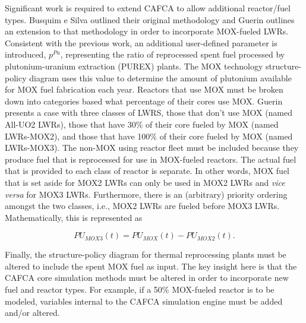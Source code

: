 Significant work is required to extend CAFCA to allow additional reactor/fuel
types. Busquim e Silva outlined their original
methodology \cite{busquim_e_silva_system_2008} and Guerin outlines an extension
to that methodology \cite{guerin_impact_2009} in order to incorporate MOX-fueled
LWRs. Consistent with the previous work, an additional user-defined parameter is
introduced, $p^{Pu}$, representing the ratio of reprocessed spent fuel processed
by plutonium-uranium extraction (PUREX) plants. The MOX technology
structure-policy diagram uses this value to determine the amount of plutonium
available for MOX fuel fabrication each year. Reactors that use MOX must be
broken down into categories based what percentage of their cores use MOX. Guerin
presents a case with three classes of LWRS, those that don't use MOX (named
All-UO2 LWRs), those that have 30\% of their core fueled by MOX (named
LWRs-MOX2), and those that have 100\% of their core fueled by MOX (named
LWRs-MOX3). The non-MOX using reactor fleet must be included because they
produce fuel that is reprocessed for use in MOX-fueled reactors. The actual fuel
that is provided to each class of reactor is separate. In other words, MOX fuel
that is set aside for MOX2 LWRs can only be used in MOX2 LWRs and \textit{vice
versa} for MOX3 LWRs. Furthermore, there is an (arbitrary) priority ordering
amongst the two classes, i.e., MOX2 LWRs are fueled before MOX3
LWRs. Mathematically, this is represented as

\begin{equation}
PU_{MOX3}(t) = PU_{MOX}(t) - PU_{MOX2}(t).
\end{equation}

Finally, the structure-policy diagram for thermal reprocessing plants must be
altered to include the spent MOX fuel as input. The key insight here is that the
CAFCA core simulation methods must be altered in order to incorporate new fuel
and reactor types. For example, if a 50\% MOX-fueled reactor is to be modeled,
variables internal to the CAFCA simulation engine must be added and/or altered. 
